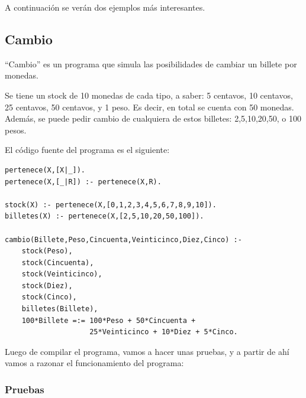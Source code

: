 \documentclass[12pt,titlepage]{article}
\begin{document}
A continuación se verán dos ejemplos más interesantes.

\subsection{Cambio}

``Cambio'' es un programa que simula las posibilidades de cambiar un billete por monedas.

Se tiene un stock de 10 monedas de cada tipo, a saber: 5 centavos, 10 centavos, 25 centavos, 50 centavos, y 1 peso. Es decir, en total se cuenta con 50 monedas. Además, se puede pedir cambio de cualquiera de estos billetes: 2,5,10,20,50, o 100 pesos.

El código fuente del programa es el siguiente:
\begin{lstlisting}
pertenece(X,[X|_]).
pertenece(X,[_|R]) :- pertenece(X,R).

stock(X) :- pertenece(X,[0,1,2,3,4,5,6,7,8,9,10]).
billetes(X) :- pertenece(X,[2,5,10,20,50,100]).

cambio(Billete,Peso,Cincuenta,Veinticinco,Diez,Cinco) :-
	stock(Peso),
	stock(Cincuenta),
	stock(Veinticinco),
	stock(Diez),
	stock(Cinco),
	billetes(Billete),
	100*Billete =:= 100*Peso + 50*Cincuenta + 
	                25*Veinticinco + 10*Diez + 5*Cinco.
\end{lstlisting}

Luego de compilar el programa, vamos a hacer unas pruebas, y a partir de ahí vamos a razonar el funcionamiento del programa:

\subsubsection{Pruebas}
\end{document}

